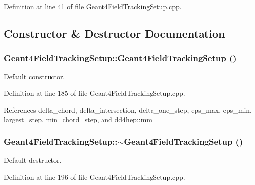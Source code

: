 Definition at line 41 of file Geant4FieldTrackingSetup.cpp.

\subsection{Constructor \& Destructor Documentation}
\hypertarget{struct_d_d4hep_1_1_simulation_1_1_geant4_field_tracking_setup_a282e719af272a3ea7fff2e80b5501539}{
\subsubsection[{Geant4FieldTrackingSetup}]{\setlength{\rightskip}{0pt plus 5cm}Geant4FieldTrackingSetup::Geant4FieldTrackingSetup ()}}
\label{struct_d_d4hep_1_1_simulation_1_1_geant4_field_tracking_setup_a282e719af272a3ea7fff2e80b5501539}


Default constructor. 

Definition at line 185 of file Geant4FieldTrackingSetup.cpp.

References delta\_\-chord, delta\_\-intersection, delta\_\-one\_\-step, eps\_\-max, eps\_\-min, largest\_\-step, min\_\-chord\_\-step, and dd4hep::mm.\hypertarget{struct_d_d4hep_1_1_simulation_1_1_geant4_field_tracking_setup_a2ada20da4d69771adbef82115109712e}{
\subsubsection[{$\sim$Geant4FieldTrackingSetup}]{\setlength{\rightskip}{0pt plus 5cm}Geant4FieldTrackingSetup::$\sim$Geant4FieldTrackingSetup ()}}
\label{struct_d_d4hep_1_1_simulation_1_1_geant4_field_tracking_setup_a2ada20da4d69771adbef82115109712e}


Default destructor. 

Definition at line 196 of file Geant4FieldTrackingSetup.cpp.

